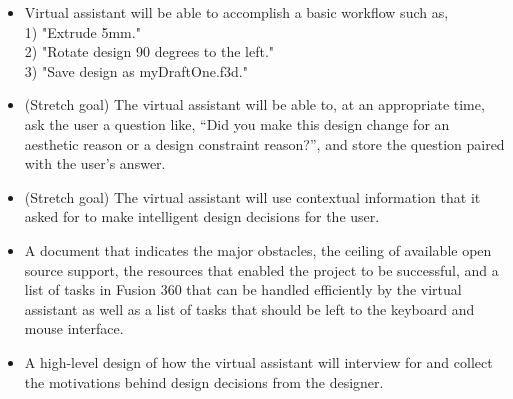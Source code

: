 \documentclass[10pt, draftclsnofoot, onecolumn]{IEEEtran}
\begin{document}
\begin{itemize}
    \item
    Virtual assistant will be able to accomplish a basic workflow such as, \\
    1) "Extrude 5mm." \\
    2) "Rotate design 90 degrees to the left." \\
    3) "Save design as myDraftOne.f3d."
    \item
    (Stretch goal) The virtual assistant will be able to, at an appropriate time, ask the user a question like, “Did you make this design change for an aesthetic reason or a design constraint reason?”, and store the question paired with the user’s answer.
    \item
    (Stretch goal) The virtual assistant will use contextual information that it asked for to make intelligent design decisions for the user.
    \item
    A document that indicates the major obstacles, the ceiling of available open source support, the resources that enabled the project to be successful, and a list of tasks in Fusion 360 that can be handled efficiently by the virtual assistant as well as a list of tasks that should be left to the keyboard and mouse interface.
    \item
    A high-level design of how the virtual assistant will interview for and collect the motivations behind design decisions from the designer.
\end{itemize}
\end{document}
